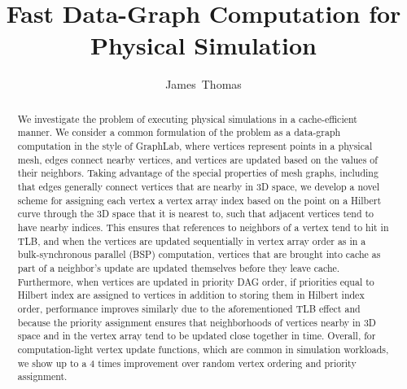 \documentclass[journal]{IEEEtran}
\begin{document}
\title{Fast Data-Graph Computation for Physical Simulation}

\author{James~Thomas%
}



\maketitle

\begin{abstract}
We investigate the problem of executing physical simulations in a cache-efficient manner. We consider a common formulation of the problem as a data-graph computation in the style of GraphLab, where vertices represent points in a physical mesh, edges connect nearby vertices, and vertices are updated based on the values of their neighbors. Taking advantage of the special properties of mesh graphs, including that edges generally connect vertices that are nearby in 3D space, we develop a novel scheme for assigning each vertex a vertex array index based on the point on a Hilbert curve through the 3D space that it is nearest to, such that adjacent vertices tend to have nearby indices. This ensures that references to neighbors of a vertex tend to hit in TLB, and when the vertices are updated sequentially in vertex array order as in a bulk-synchronous parallel (BSP) computation, vertices that are brought into cache as part of a neighbor's update are updated themselves before they leave cache. Furthermore, when vertices are updated in priority DAG order, if priorities equal to Hilbert index are assigned to vertices in addition to storing them in Hilbert index order, performance improves similarly due to the aforementioned TLB effect and because the priority assignment ensures that neighborhoods of vertices nearby in 3D space and in the vertex array tend to be updated close together in time. Overall, for computation-light vertex update functions, which are common in simulation workloads, we show up to a 4 times improvement over random vertex ordering and priority assignment.

\end{abstract}


\IEEEpeerreviewmaketitle
\end{document}
